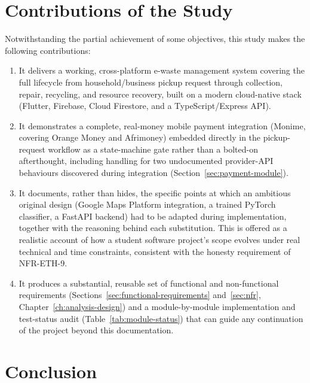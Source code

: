 \section{Contributions of the Study}

Notwithstanding the partial achievement of some objectives, this study
makes the following contributions:

\begin{enumerate}[leftmargin=1.4cm]
  \item It delivers a working, cross-platform e-waste management system
    covering the full lifecycle from household/business pickup request
    through collection, repair, recycling, and resource recovery, built on
    a modern cloud-native stack (Flutter, Firebase, Cloud Firestore, and a
    TypeScript/Express API).
  \item It demonstrates a complete, real-money mobile payment integration
    (Monime, covering Orange Money and Afrimoney) embedded directly in the
    pickup-request workflow as a state-machine gate rather than a
    bolted-on afterthought, including handling for two undocumented
    provider-API behaviours discovered during integration
    (Section~\ref{sec:payment-module}).
  \item It documents, rather than hides, the specific points at which an
    ambitious original design (Google Maps Platform integration, a trained
    PyTorch classifier, a FastAPI backend) had to be adapted during
    implementation, together with the reasoning behind each substitution.
    This is offered as a realistic account of how a student software
    project's scope evolves under real technical and time constraints,
    consistent with the honesty requirement of NFR-ETH-9.
  \item It produces a substantial, reusable set of functional and
    non-functional requirements (Sections~\ref{sec:functional-requirements}
    and~\ref{sec:nfr}, Chapter~\ref{ch:analysis-design})
    and a module-by-module implementation and test-status audit
    (Table~\ref{tab:module-status}) that can guide any continuation of the
    project beyond this documentation.
\end{enumerate}

\section{Conclusion}

